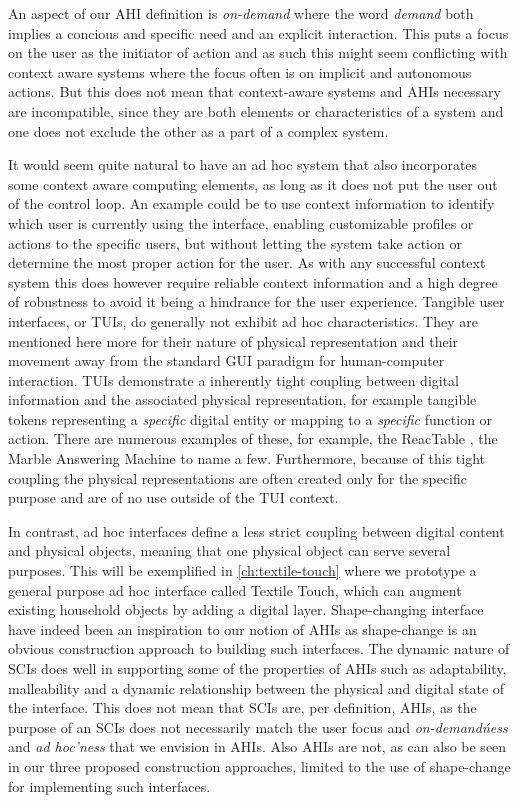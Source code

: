 An aspect of our AHI definition is \emph{on-demand} where the word \emph{demand} both implies a concious and specific need and an explicit interaction.
This puts a focus on the user as the initiator of action and as such this might seem conflicting with context aware systems where the focus often is on implicit and autonomous actions.
But this does not mean that context-aware systems and AHIs necessary are incompatible, since they are both elements or characteristics of a system and one does not exclude the other as a part of a complex system.

It would seem quite natural to have an ad hoc system that also incorporates some context aware computing elements, as long as it does not put the user out of the control loop.
An example could be to use context information to identify which user is currently using the interface, enabling customizable profiles or actions to the specific users, but without letting the system take action or determine the most proper action for the user.
As with any successful context system this does however require reliable context information and a high degree of robustness to avoid it being a hindrance for the user experience.
\blank
Tangible user interfaces, or TUIs, do generally not exhibit ad hoc characteristics. 
They are mentioned here more for their nature of physical representation and their movement away from the standard GUI paradigm for human-computer interaction.
TUIs demonstrate a inherently tight coupling between digital information and the associated physical representation, for example tangible tokens representing a \emph{specific} digital entity or mapping to a \emph{specific} function or action.
There are numerous examples of these, for example, the ReacTable \cite{jorda2007reactable}, the Marble Answering Machine  to name a few.
Furthermore, because of this tight coupling the physical representations are often created only for the specific purpose and are of no use outside of the TUI context. 

In contrast, ad hoc interfaces define a less strict coupling between digital content and physical objects, meaning that one physical object can serve several purposes.
This will be exemplified in \autoref{ch:textile-touch} where we prototype a general purpose ad hoc interface called Textile Touch, which can augment existing household objects by adding a digital layer. 
\blank
Shape-changing interface have indeed been an inspiration to our notion of AHIs as shape-change is an obvious construction approach to building such interfaces.
The dynamic nature of SCIs does well in supporting some of the properties of AHIs such as adaptability, malleability and a dynamic relationship between the physical and digital state of the interface.
This does not mean that SCIs are, per definition, AHIs, as the purpose of an SCIs does not necessarily match the user focus and \emph{on-demand\'ness} and \emph{ad hoc'ness} that we envision in AHIs.
Also AHIs are not, as can also be seen in our three proposed construction approaches, limited to the use of shape-change for implementing such interfaces.  

